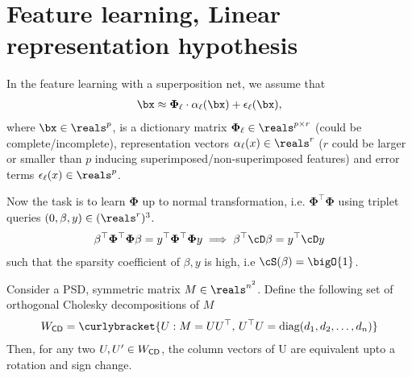 \section{Feature learning, Linear representation hypothesis}

In the feature learning with a superposition net, we assume that
\begin{align*}
    \bx \approx \mathbf{\Phi}_{\ell}\cdot \alpha_\ell(\bx) + \epsilon_{\ell}(\bx),
\end{align*}
where $\bx \in \reals^p$, is a dictionary matrix $\mathbf{\Phi}_{\ell} \in \reals^{p \times r}$ (could be complete/incomplete), representation vectors $\alpha_\ell(x) \in \reals^r$ ($r$ could be larger or smaller than $p$ inducing superimposed/non-superimposed features) and error terms $\epsilon_\ell(x) \in \reals^p$.

Now the task is to learn $\mathbf{\Phi}$ up to normal transformation, i.e. $\mathbf{\Phi}^{\top}\mathbf{\Phi}$ using triplet queries $(0, \beta, y) \in (\reals^{r})^3$.
\begin{align*}
    \beta^{\top} \mathbf{\Phi}^{\top}\mathbf{\Phi}\beta = y^\top \mathbf{\Phi}^{\top}\mathbf{\Phi}y
    \implies \beta^\top \cD \beta = y^{\top}\cD y
\end{align*}
such that the sparsity coefficient of $\beta, y$ is high, i.e $\cS(\beta) = \bigO{1}$.


\begin{lemma} Consider a PSD, symmetric matrix $M \in \reals^{n^2}$. Define the following set of orthogonal Cholesky decompositions of $M$
\begin{align*}
    W_{\sf{CD}} = \curlybracket{U : M = UU^\top,\, U^\top U = \text{diag}(d_1, d_2, \ldots, d_n)}
\end{align*}
    Then, for any two $U,U' \in W_{\sf{CD}}$, the column vectors of U are equivalent upto a rotation and sign change.
\end{lemma}